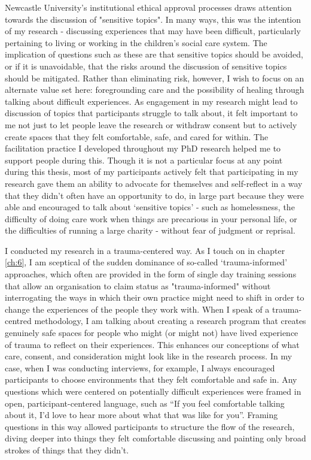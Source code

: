 Newcastle University’s institutional ethical approval processes draws attention towards the discussion of "sensitive topics". In many ways, this was the intention of my research - discussing experiences that may have been difficult, particularly pertaining to living or working in the children’s social care system. The implication of questions such as these are that sensitive topics should be avoided, or if it is unavoidable, that the risks around the discussion of sensitive topics should be mitigated. Rather than eliminating risk, however, I wish to focus on an alternate value set here: foregrounding care and the possibility of healing through talking about difficult experiences. As engagement in my research might lead to discussion of topics that participants struggle to talk about, it felt important to me not just to let people leave the research or withdraw consent but to actively create spaces that they felt comfortable, safe, and cared for within. The facilitation practice I developed throughout my PhD research helped me to support people during this. Though it is not a particular focus at any point during this thesis, most of my participants actively felt that participating in my research gave them an ability to advocate for themselves and self-reflect in a way that they didn’t often have an opportunity to do, in large part because they were able and encouraged to talk about ‘sensitive topics’ - such as homelessness, the difficulty of doing care work when things are precarious in your personal life, or the difficulties of running a large charity  - without fear of judgment or reprisal. 

I conducted my research in a trauma-centered way. As I touch on in chapter \ref{ch:6}, I am sceptical of the sudden dominance of so-called ‘trauma-informed’ approaches, which often are provided in the form of single day training sessions that allow an organisation to claim status as "trauma-informed" without interrogating the ways in which their own practice might need to shift in order to change the experiences of the people they work with. When I speak of a trauma-centred methodology, I am talking about creating a research program that creates genuinely safe spaces for people who might (or might not) have lived experience of trauma to reflect on their experiences. This enhances our conceptions of what care, consent, and consideration might look like in the research process. In my case, when I was conducting interviews, for example, I always encouraged participants to choose environments that they felt comfortable and safe in. Any questions which were centered on potentially difficult experiences were framed in open, participant-centered language, such as “If you feel comfortable talking about it, I’d love to hear more about what that was like for you”. Framing questions in this way allowed participants to structure the flow of the research, diving deeper into things they felt comfortable discussing and painting only broad strokes of things that they didn’t. 

